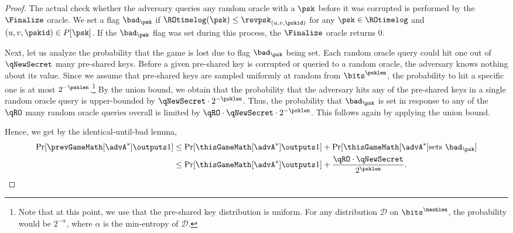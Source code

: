 \begin{proof}
	The actual check whether the adversary queries any random oracle with a $\psk$ before it was corrupted is performed by the $\Finalize$ oracle.
	We set a flag $\bad_\psk$ if $\ROtimelog(\psk) \leq \revpsk_{(u,v,\pskid)}$ for any $\psk \in \ROtimelog$ and $(u,v,\pskid) \in P[\psk]$.
	If the $\bad_\psk$ flag was set during this process, the $\Finalize$ oracle returns $0$.
	
	Next, let us analyze the probability that the game is lost due to flag $\bad_\psk$ being set.
	Each random oracle query could hit one out of $\qNewSecret$ many pre-shared keys.
	Before a given pre-shared key is corrupted or queried to a random oracle, the adversary knows nothing about its value. 
	Since we assume that pre-shared keys are sampled uniformly at random from $\bits^\psklen$, the probability to hit a specific one is at most $2^{-\psklen}$.\footnote{Note that at this point, we use that the pre-shared key distribution is uniform. For any distribution $\mathcal D$ on $\bits^\hashlen$, the probability would be $2^{-\alpha}$, where $\alpha$ is the min-entropy of $\mathcal D$.}
	By the union bound, we obtain that the probability that the adversary hits any of the pre-shared keys in a single random oracle query is upper-bounded by $\qNewSecret \cdot 2^{-\psklen}$. 	
	Thus, the probability that $\bad_\psk$ is set in response to any of the $\qRO$ many random oracle queries overall is limited by $\qRO \cdot \qNewSecret \cdot 2^{-\psklen}$. 
	This follows again by applying the union bound.
	
	Hence, we get by the identical-until-bad lemma, 
	\begin{align*}
		\Pr[ \prevGameMath[\advA^*] \outputs 1 ] &\leq \Pr[ \thisGameMath[\advA^*] \outputs 1 ] + \Pr[ \thisGameMath[\advA^*] \text{sets }\bad_\psk ] \\
		&\leq \Pr[ \thisGameMath[\advA^*] \outputs 1 ] + \frac{\qRO \cdot \qNewSecret}{2^\psklen} .
	\end{align*}
	

\end{proof}
